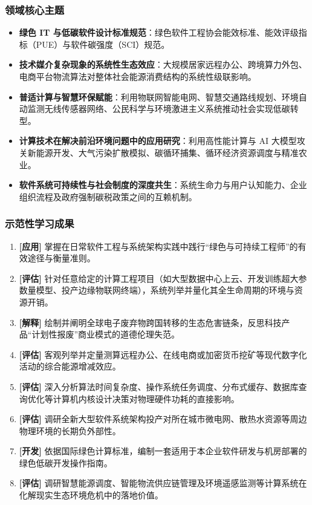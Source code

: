 \subsubsection{领域核心主题}
\begin{itemize}
    \item \textbf{绿色 IT 与低碳软件设计标准规范}：绿色软件工程协会能效标准、能效评级指标（PUE）与软件碳强度（SCI）规范。
    \item \textbf{技术媒介复杂现象的系统性生态效应}：大规模居家远程办公、跨境算力外包、电商平台物流算法对整体社会能源消费结构的系统性级联影响。
    \item \textbf{普适计算与智慧环保赋能}：利用物联网智能电网、智慧交通路线规划、环境自动监测无线传感器网络、公民科学与环境激进主义系统推动社会实现低碳转型。
    \item \textbf{计算技术在解决前沿环境问题中的应用研究}：利用高性能计算与 AI 大模型攻关新能源开发、大气污染扩散模拟、碳循环捕集、循环经济资源调度与精准农业。
    \item \textbf{软件系统可持续性与社会制度的深度共生}：系统生命力与用户认知能力、企业组织流程及政府强制碳税政策之间的互赖机制。
\end{itemize}

\subsubsection{示范性学习成果}
\begin{enumerate}
    \item \textbf{[应用]} 掌握在日常软件工程与系统架构实践中践行“绿色与可持续工程师”的有效途径与衡量准则。
    \item \textbf{[评估]} 针对任意给定的计算工程项目（如大型数据中心上云、开发训练超大参数量模型、投产边缘物联网终端），系统列举并量化其全生命周期的环境与资源开销。
    \item \textbf{[解释]} 绘制并阐明全球电子废弃物跨国转移的生态危害链条，反思科技产品“计划性报废”商业模式的道德伦理失范。
    \item \textbf{[评估]} 客观列举并定量测算远程办公、在线电商或加密货币挖矿等现代数字化活动的综合能源增减效应。
    \item \textbf{[评估]} 深入分析算法时间复杂度、操作系统任务调度、分布式缓存、数据库查询优化等计算机内核设计决策对物理硬件功耗的直接影响。
    \item \textbf{[评估]} 调研全新大型软件系统架构投产对所在城市微电网、散热水资源等周边物理环境的长期负外部性。
    \item \textbf{[开发]} 依据国际绿色计算标准，编制一套适用于本企业软件研发与机房部署的绿色低碳开发操作指南。
    \item \textbf{[评估]} 调研智慧能源调度、智能物流供应链管理及环境遥感监测等计算系统在化解现实生态环境危机中的落地价值。
\end{enumerate}

